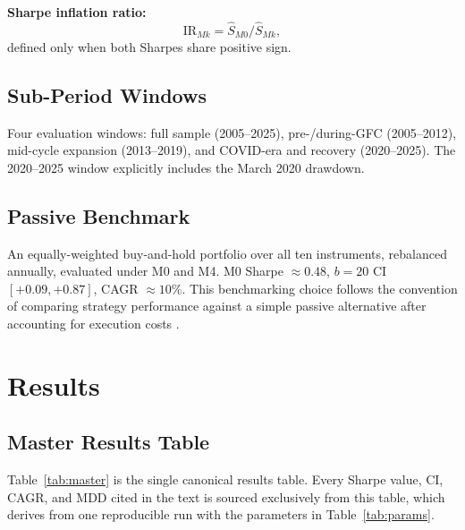 \documentclass[12pt]{article}
\begin{document}
\textbf{Sharpe inflation ratio:}
\begin{equation}
  \mathrm{IR}_{Mk} = \hat S_{M0} / \hat S_{Mk},
  \label{eq:ir}
\end{equation}
defined only when both Sharpes share positive sign.

\subsection{Sub-Period Windows}

Four evaluation windows: full sample (2005--2025), pre-/during-GFC
(2005--2012), mid-cycle expansion (2013--2019), and COVID-era and
recovery (2020--2025). The 2020--2025 window explicitly includes
the March 2020 drawdown.

\subsection{Passive Benchmark}

An equally-weighted buy-and-hold portfolio over all ten instruments,
rebalanced annually, evaluated under M0 and M4. M0 Sharpe $\approx 0.48$,
$b = 20$ CI $[+0.09, +0.87]$, CAGR $\approx 10\%$.
This benchmarking choice follows the convention of comparing
strategy performance against a simple passive alternative after
accounting for execution costs \citep{korajczyk2004momentum,novymarx2016taxonomy}.


\section{Results}
\label{sec:results}

\subsection{Master Results Table}
\label{sec:master}

Table~\ref{tab:master} is the single canonical results table. Every
Sharpe value, CI, CAGR, and MDD cited in the text is sourced
exclusively from this table, which derives from one reproducible run
with the parameters in Table~\ref{tab:params}.
\end{document}
